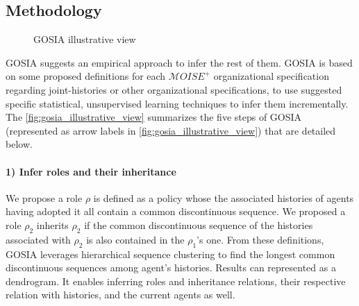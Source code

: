 \documentclass[sn-mathphys-num]{sn-jnl}%
\theoremstyle{thmstyleone}%
\theoremstyle{thmstyletwo}%
\theoremstyle{thmstylethree}%
\begin{document}
\subsection{Methodology}


\begin{figure*}[h!]
    \centering
    
    \caption{GOSIA illustrative view}
    \label{fig:gosia_illustrative_view}
\end{figure*}

GOSIA suggests an empirical approach to infer the rest of them.
GOSIA is based on some proposed definitions for each $\mathcal{M}OISE^+$ organizational specification regarding joint-histories or other organizational specifications, to use suggested specific statistical, unsupervised learning techniques to infer them incrementally. The \autoref{fig:gosia_illustrative_view} summarizes the five steps of GOSIA (represented as arrow labels in \autoref{fig:gosia_illustrative_view}) that are detailed below.
%
\paragraph{1) Infer roles and their inheritance}

We propose a role $\rho$ is defined as a policy whose the associated histories of agents having adopted it all contain a common discontinuous sequence. We proposed a role $\rho_2$ inherits $\rho_2$ if the common discontinuous sequence of the histories associated with $\rho_2$ is also contained in the $\rho_1$'s one.
From these definitions, GOSIA leverages hierarchical sequence clustering to find the longest common discontinuous sequences among agent's histories. Results can represented as a dendrogram. It enables inferring roles and inheritance relations, their respective relation with histories, and the current agents as well.
\end{document}
